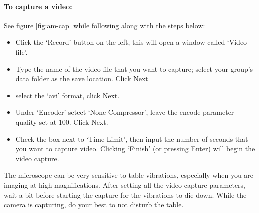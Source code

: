 \paragraph*{To capture a video:}
See figure \ref{fig:am-cap} while following along with the steps below:
\begin{itemize}
\item Click the `Record' button on the left, this will open a window called `Video file'.
\item Type the name of the video file that you want to capture; select your group's data folder as the save location. Click Next
\item select the `avi' format, click Next.
\item Under `Encoder' setect `None Compressor', leave the encode parameter quality set at 100. Click Next.
\item Check the box next to `Time Limit', then input the number of seconds that you want to capture video. Clicking `Finish' (or pressing Enter) will begin the video capture.
\end{itemize}
The microscope can be very sensitive to table vibrations, especially when you are imaging at high magnifications. 
After setting all the video capture parameters, wait a bit before starting the capture for the vibrations to die down.
While the camera is capturing, do your best to not disturb the table.

